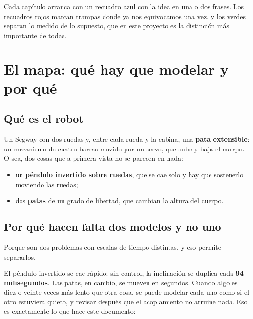 \documentclass[11pt,a4paper]{report}
\begin{document}
Cada capítulo arranca con un recuadro azul con la idea en una o dos frases. Los recuadros
rojos marcan trampas donde ya nos equivocamos una vez, y los verdes separan lo medido de lo
supuesto, que en este proyecto es la distinción más importante de todas.

\tableofcontents

\chapter{El mapa: qué hay que modelar y por qué}

\section{Qué es el robot}

Un Segway con dos ruedas y, entre cada rueda y la cabina, una \textbf{pata extensible}: un
mecanismo de cuatro barras movido por un servo, que sube y baja el cuerpo. O sea, dos cosas
que a primera vista no se parecen en nada:

\begin{itemize}[leftmargin=1.5em]
\item un \textbf{péndulo invertido sobre ruedas}, que se cae solo y hay que sostenerlo
      moviendo las ruedas;
\item dos \textbf{patas} de un grado de libertad, que cambian la altura del cuerpo.
\end{itemize}

\section{Por qué hacen falta dos modelos y no uno}

Porque son dos problemas con escalas de tiempo distintas, y eso permite separarlos.

El péndulo invertido se cae rápido: sin control, la inclinación se duplica cada
\textbf{94 milisegundos}. Las patas, en cambio, se mueven en segundos. Cuando algo es diez
o veinte veces más lento que otra cosa, se puede modelar cada uno como si el otro estuviera
quieto, y revisar después que el acoplamiento no arruine nada. Eso es exactamente lo que hace
este documento:
\end{document}
